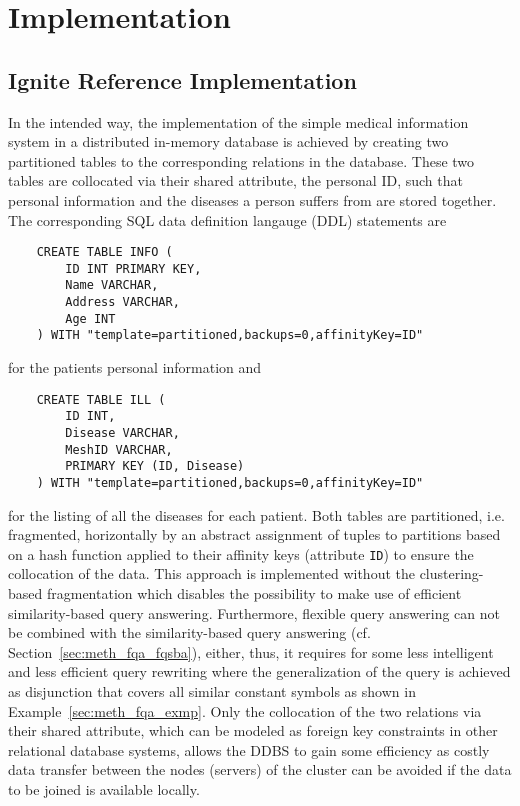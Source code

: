 
\section{Implementation}
\label{sec:impl}


\subsection{Ignite Reference Implementation}
\label{sec:impl_refimpl}
In the intended way, the implementation of the simple medical information system in a distributed in-memory  database is achieved by 
creating two partitioned tables to the corresponding relations in the database. These two tables are collocated via their shared attribute, the personal ID,
such that personal information and the diseases a person suffers from are stored together. The corresponding SQL data definition langauge (DDL) statements are

\begin{verbatim}
    CREATE TABLE INFO (
        ID INT PRIMARY KEY,
        Name VARCHAR,
        Address VARCHAR,
        Age INT
    ) WITH "template=partitioned,backups=0,affinityKey=ID"
\end{verbatim}
for the patients personal information and
\begin{verbatim}
    CREATE TABLE ILL (
        ID INT,
        Disease VARCHAR,
        MeshID VARCHAR,
        PRIMARY KEY (ID, Disease)
    ) WITH "template=partitioned,backups=0,affinityKey=ID"
\end{verbatim}
for the listing of all the diseases for each patient. Both tables are partitioned, i.e. fragmented, horizontally by an abstract assignment of tuples to
partitions based on a hash function applied to their affinity keys (attribute \verb!ID!) to ensure the collocation of the data. This approach is implemented
without the clustering-based fragmentation which disables the possibility to make use of efficient similarity-based query answering. Furthermore, flexible 
query answering can not be combined with the similarity-based query answering (cf. Section~\ref{sec:meth_fqa_fqsba}), either, thus, it requires for some less
intelligent and less efficient query rewriting where the generalization of the query is achieved as disjunction that covers all similar constant symbols as
shown in Example~\ref{sec:meth_fqa_exmp}. Only the collocation of the two relations via their shared attribute, which can be modeled as foreign key constraints
in other relational database systems, allows the DDBS to gain some efficiency as costly data transfer between the nodes (servers) of the cluster can be avoided
if the data to be joined is available locally.

